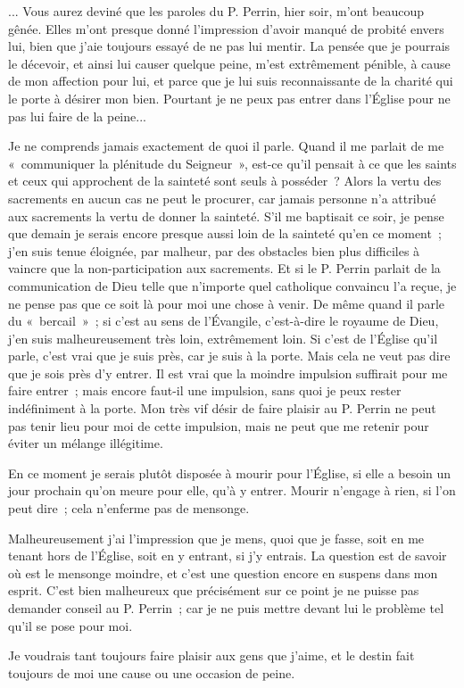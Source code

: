 \documentclass[french,twoside]{book} %
\begin{document}
\noindent ... Vous aurez deviné que les paroles du P. Perrin, hier soir, m'ont beaucoup gênée. Elles m'ont presque donné l'impression d'avoir manqué de probité envers lui, bien que j'aie toujours essayé de ne pas lui mentir. La pensée que je pourrais le décevoir, et ainsi lui causer quelque peine, m'est extrêmement pénible, à cause de mon affection pour lui, et parce que je lui suis reconnaissante de la charité qui le porte à désirer mon bien. Pourtant je ne peux pas entrer dans l'Église pour ne pas lui faire de la peine...\par
Je ne comprends jamais exactement de quoi il parle. Quand il me parlait de me « communiquer la plénitude du Seigneur », est-ce qu'il pensait à ce que les saints et ceux qui approchent de la sainteté sont seuls à posséder ? Alors la vertu des sacrements en aucun cas ne peut le procurer, car jamais personne n'a attribué aux sacrements la vertu de donner la sainteté. S'il me baptisait ce soir, je pense que demain je serais encore presque aussi loin de la sainteté qu'en ce moment ; j'en suis tenue éloignée, par malheur, par des obstacles bien plus difficiles à vaincre que la non-participation aux sacrements. Et si le P. Perrin parlait de la communication de Dieu telle que n'importe quel catholique convaincu l'a reçue, je ne pense pas que ce soit là pour moi une chose à venir. De même quand il parle du « bercail » ; si c'est au sens de l'Évangile, c'est-à-dire le royaume de Dieu, j'en suis malheureusement très loin, extrêmement loin. Si c'est de l'Église qu'il parle, c'est vrai que je suis près, car je suis à la porte. Mais cela ne veut pas dire que je sois près d'y entrer. Il est vrai que la moindre impulsion suffirait pour me faire entrer ; mais encore faut-il une impulsion, sans quoi je peux rester indéfiniment à la porte. Mon très vif désir de faire plaisir au P. Perrin ne peut pas tenir lieu pour moi de cette impulsion, mais ne peut que me retenir pour éviter un mélange illégitime.\par
En ce moment je serais plutôt disposée à mourir pour l'Église, si elle a besoin un jour prochain qu'on meure pour elle, qu'à y entrer. Mourir n'engage à rien, si l'on peut dire ; cela n'enferme pas de mensonge.\par
Malheureusement j'ai l'impression que je mens, quoi que je fasse, soit en me tenant hors de l'Église, soit en y entrant, si j'y entrais. La question est de savoir où est le mensonge moindre, et c'est une question encore en suspens dans mon esprit. C'est bien malheureux que précisément sur ce point je ne puisse pas demander conseil au P. Perrin ; car je ne puis mettre devant lui le problème tel qu'il se pose pour moi.\par
Je voudrais tant toujours faire plaisir aux gens que j'aime, et le destin fait toujours de moi une cause ou une occasion de peine.\par
\end{document}
